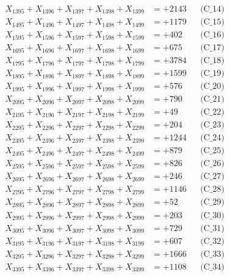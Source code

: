 \documentclass[a4paper,10pt]{article}
\begin{document}
{\begin{align}
X_{1395} + X_{1396} + X_{1397} + X_{1398} + X_{1399} &= +2143 && \text{(C\_14)} \\
X_{1495} + X_{1496} + X_{1497} + X_{1498} + X_{1499} &= +1179 && \text{(C\_15)} \\
\allowbreak
X_{1595} + X_{1596} + X_{1597} + X_{1598} + X_{1599} &= +402 && \text{(C\_16)} \\
X_{1695} + X_{1696} + X_{1697} + X_{1698} + X_{1699} &= +675 && \text{(C\_17)} \\
X_{1795} + X_{1796} + X_{1797} + X_{1798} + X_{1799} &= +3784 && \text{(C\_18)} \\
X_{1895} + X_{1896} + X_{1897} + X_{1898} + X_{1899} &= +1599 && \text{(C\_19)} \\
X_{1995} + X_{1996} + X_{1997} + X_{1998} + X_{1999} &= +576 && \text{(C\_20)} \\
\allowbreak
X_{2095} + X_{2096} + X_{2097} + X_{2098} + X_{2099} &= +790 && \text{(C\_21)} \\
X_{2195} + X_{2196} + X_{2197} + X_{2198} + X_{2199} &= +49 && \text{(C\_22)} \\
X_{2295} + X_{2296} + X_{2297} + X_{2298} + X_{2299} &= +204 && \text{(C\_23)} \\
X_{2395} + X_{2396} + X_{2397} + X_{2398} + X_{2399} &= +1244 && \text{(C\_24)} \\
X_{2495} + X_{2496} + X_{2497} + X_{2498} + X_{2499} &= +879 && \text{(C\_25)} \\
\allowbreak
X_{2595} + X_{2596} + X_{2597} + X_{2598} + X_{2599} &= +826 && \text{(C\_26)} \\
X_{2695} + X_{2696} + X_{2697} + X_{2698} + X_{2699} &= +246 && \text{(C\_27)} \\
X_{2795} + X_{2796} + X_{2797} + X_{2798} + X_{2799} &= +1146 && \text{(C\_28)} \\
X_{2895} + X_{2896} + X_{2897} + X_{2898} + X_{2899} &= +52 && \text{(C\_29)} \\
X_{2995} + X_{2996} + X_{2997} + X_{2998} + X_{2999} &= +203 && \text{(C\_30)} \\
\allowbreak
X_{3095} + X_{3096} + X_{3097} + X_{3098} + X_{3099} &= +729 && \text{(C\_31)} \\
X_{3195} + X_{3196} + X_{3197} + X_{3198} + X_{3199} &= +607 && \text{(C\_32)} \\
X_{3295} + X_{3296} + X_{3297} + X_{3298} + X_{3299} &= +1666 && \text{(C\_33)} \\
X_{3395} + X_{3396} + X_{3397} + X_{3398} + X_{3399} &= +1108 && \text{(C\_34)} \\

\end{align}}
\end{document}
